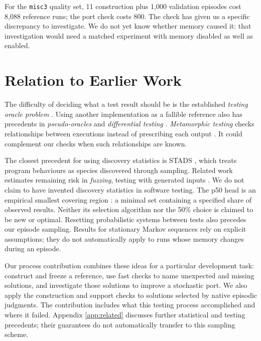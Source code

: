\documentclass[10pt,letterpaper]{article}
\begin{document}
For the \texttt{misc3} quality set, 11 construction plus 1,000 validation episodes cost
8,088 reference runs; the port check costs 800. The check has given us a specific
discrepancy to investigate. We do not yet know whether memory caused it: that
investigation would need a matched experiment with memory disabled as well as enabled.

\section{Relation to Earlier Work}\label{sec:related}

The difficulty of deciding what a test result should be is the established \emph{testing
oracle problem} \citep{ref1, ref3, ref26}. Using another implementation as a fallible
reference also has precedents in \emph{pseudo-oracles} \citep{ref2} and \emph{differential
testing} \citep{ref4}. \emph{Metamorphic testing} checks relationships between executions
instead of prescribing each output \citep{ref7, ref5, ref28}. It could complement our
checks when such relationships are known.

The closest precedent for using discovery statistics is STADS \citep{ref13}, which treats
program behaviours as species discovered through sampling. Related work estimates
remaining risk in \emph{fuzzing}, testing with generated inputs \citep{ref14}. We do not
claim to have invented discovery statistics in software testing. The p50 head is an
empirical smallest covering region \citep{ref33}: a minimal set containing a specified
share of observed results. Neither its selection algorithm nor the 50\% choice is claimed
to be new or optimal. Resetting probabilistic systems between tests \citep{ref34} also
precedes our episode sampling. Results for stationary Markov sequences \citep{ref35} rely
on explicit assumptions; they do not automatically apply to runs whose memory changes
during an episode.

Our process contribution combines these ideas for a particular development task: construct
and freeze a reference, use fast checks to name unexpected and missing solutions, and
investigate those solutions to improve a stochastic port. We also apply the construction
and support checks to solutions selected by native episodic judgments. The contribution
includes what this testing process accomplished and where it failed. Appendix
\ref{app:related} discusses further statistical and testing precedents; their guarantees
do not automatically transfer to this sampling scheme.
\end{document}
